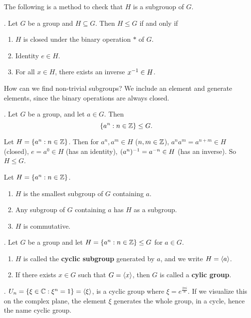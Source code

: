The following is a method to check that \(H\) is a subgrouop of \(G\).

\thm. Let \(G\) be a group and \(H \subseteq G\). Then \(H \leq G\) if and only if
\begin{enumerate}
    \item \(H\) is closed under the binary operation \(*\) of \(G\).
    \item Identity \(e \in H\).
    \item For all \(x \in H\), there exists an inverse \(x^{-1} \in H\).
\end{enumerate}

How can we find non-trivial subgroups? We include an element and generate elements, since the binary operations are always closed.

\thm. Let \(G\) be a group, and let \(a \in G\). Then
\[
    \{a^n : n \in \mathbb{Z}\} \leq G.
\]

\pf Let \(H = \{a^n : n \in \mathbb{Z}\}\). Then for \(a^n, a^m \in H\) (\(n, m \in \mathbb{Z}\)), \(a^na^m = a^{n+m} \in H\) (closed), \(e = a^0 \in H\) (has an identity), \((a^n)^{-1} = a^{-n} \in H\) (has an inverse). So \(H \leq G\).

\rmk Let \(H = \{a^n : n \in \mathbb{Z}\}\).
\begin{enumerate}
    \item \(H\) is the smallest subgroup of \(G\) containing \(a\).
    \item Any subgroup of \(G\) containing \(a\) has \(H\) as a subgroup.
    \item \(H\) is commutative.
\end{enumerate}

.  Let \(G\) be a group and let \(H = \{a^n : n \in \mathbb{Z}\} \leq G\) for \(a \in G\).
\begin{enumerate}
    \item \(H\) is called the \textbf{cyclic subgroup} generated by \(a\), and we write \(H = \left\langle a \right\rangle\).
    \item If there exists \(x \in G\) such that \(G = \left\langle x \right\rangle\), then \(G\) is called a \textbf{cylic group}.
\end{enumerate}

\ex. \(U_n = \{\xi \in \mathbb{C} : \xi^n = 1\} = \left\langle \xi \right\rangle\), is a cyclic group where \(\xi = e^{\frac{2\pi i}{n}}\). If we visualize this on the complex plane, the element \(\xi\) generates the whole group, in a cycle, hence the name cyclic group.
\pagebreak
